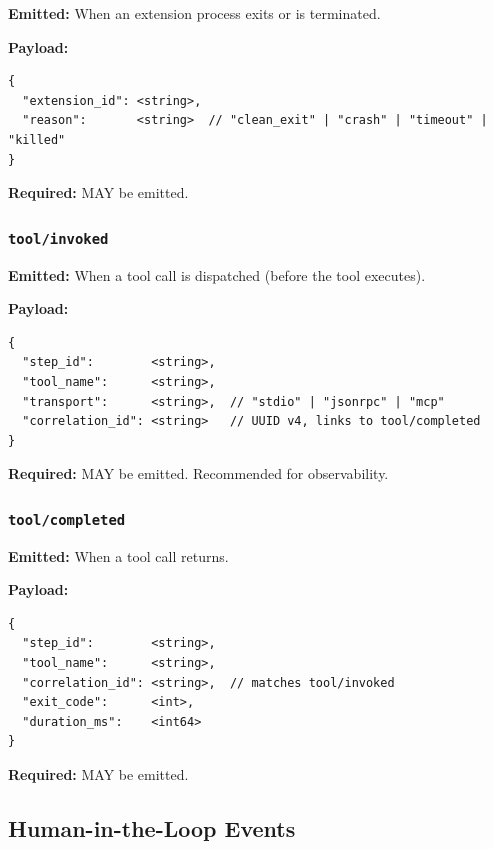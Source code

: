 \textbf{Emitted:} When an extension process exits or is terminated.

\textbf{Payload:}
\begin{verbatim}
{
  "extension_id": <string>,
  "reason":       <string>  // "clean_exit" | "crash" | "timeout" | "killed"
}
\end{verbatim}

\textbf{Required:} MAY be emitted.


\subsubsection{\texttt{tool/invoked}}

\textbf{Emitted:} When a tool call is dispatched (before the tool executes).

\textbf{Payload:}
\begin{verbatim}
{
  "step_id":        <string>,
  "tool_name":      <string>,
  "transport":      <string>,  // "stdio" | "jsonrpc" | "mcp"
  "correlation_id": <string>   // UUID v4, links to tool/completed
}
\end{verbatim}

\textbf{Required:} MAY be emitted. Recommended for observability.


\subsubsection{\texttt{tool/completed}}

\textbf{Emitted:} When a tool call returns.

\textbf{Payload:}
\begin{verbatim}
{
  "step_id":        <string>,
  "tool_name":      <string>,
  "correlation_id": <string>,  // matches tool/invoked
  "exit_code":      <int>,
  "duration_ms":    <int64>
}
\end{verbatim}

\textbf{Required:} MAY be emitted.


\subsection{Human-in-the-Loop Events}

